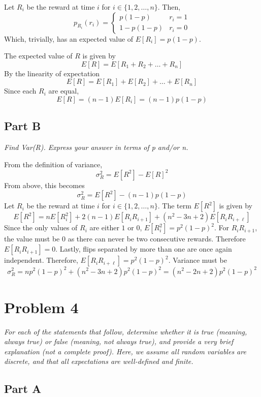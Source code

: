 \documentclass{article}
\begin{document}
Let $ R_i $ be the reward at time $ i $ for $ i \in \{ 1, 2, \ldots, n \} $.
Then,
$$ p_{R_i}(r_i) = \begin{cases}
    p(1 - p) & r_i = 1 \\
    1 - p(1 - p) & r_i = 0
\end{cases} $$
Which, trivially, has an expected value of $ E[R_i] = p(1 - p) $.

The expected value of $ R $ is given by
$$ E[R] = E[R_1 + R_2 + \ldots + R_n] $$
By the linearity of expectation
$$ E[R] = E[R_1] + E[R_2] + \ldots + E[R_n] $$
Since each $ R_i $ are equal,
$$ E[R] = (n - 1) E[R_i] = (n - 1) p (1 - p) $$

\subsection*{Part B}

\textit{Find Var(R). Express your answer in terms of p and/or n.}

\bigbreak

From the definition of variance,
$$ \sigma_R^2 = E[R^2] - E[R]^2 $$
From above, this becomes
$$ \sigma_R^2 = E[R^2] - (n - 1) p (1 - p) $$
Let $ R_i $ be the reward at time $ i $ for $ i \in \{ 1, 2, \ldots, n \} $.
The term $ E[R^2] $ is given by
$$ E[R^2] = n E[R_i^2] + 2(n - 1) E[R_i R_{i + 1}] + (n^2 - 3n + 2) E[R_i
R_{i + \ell}] $$
Since the only values of $ R_i $ are either $ 1 $ or $ 0 $, $ E[R_i^2] =
p^2(1 - p)^2 $. For $ R_i R_{i + 1} $, the value must be $ 0 $ as there can
never be two consecutive rewards. Therefore $ E[R_i R_{i + 1}] = 0 $. Lastly,
flips separated by more than one are once again independent. Therefore, $
E[R_i R_{i + \ell}] = p^2(1 - p)^2 $. Variance must be
$$ \sigma_R^2 = n p^2 (1 - p)^2 + (n^2 - 3n + 2) p^2 (1 - p)^2 = (n^2 - 2n +
2) p^2 (1 - p)^2 $$

\section*{Problem 4}

\textit{ For each of the statements that follow, determine whether it is true
(meaning, always true) or false (meaning, not always true), and provide a
very brief explanation (not a complete proof). Here, we assume all random
variables are discrete, and that all expectations are well-defined and
finite. }

\subsection*{Part A}
\end{document}
